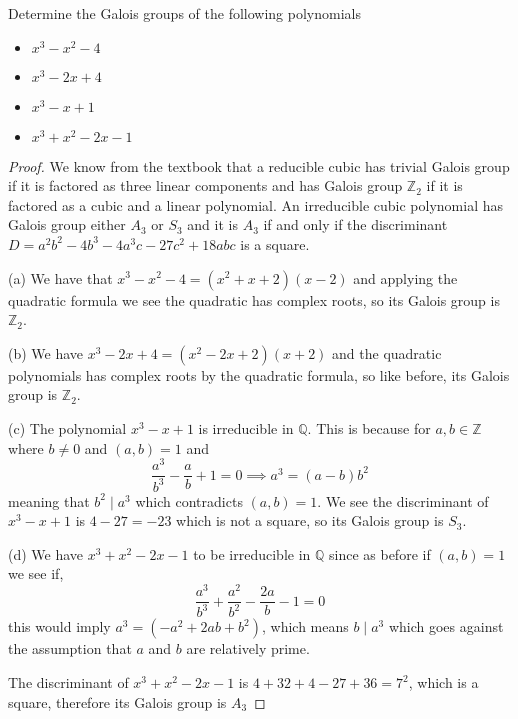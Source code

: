 \documentclass[11pt]{article}
\newenvironment{problem}[2][Problem\!]{\begin{tcolorbox}\begin{trivlist}
\item[\hskip \labelsep {\bfseries #1}\hskip \labelsep {\bfseries #2}]}{\end{trivlist}\end{tcolorbox}}
\newcommand{\zz}{\mathbb Z}   %
\newcommand{\qq}{\mathbb Q}   %
\begin{document}
\begin{problem}{14.6.2}
    Determine the Galois groups of the following polynomials
    \begin{itemize}
        \item[(a)] $x^{3} -x^{2} -4$
        \item[(b)] $x^{3} -2x + 4$
        \item[(c)] $x^{3} -x + 1$
        \item[(d)] $x^{3} + x^{2} -2x -1$
    \end{itemize}
\end{problem}
\begin{proof}
    We know from the textbook that a reducible cubic has trivial Galois group if it is factored as three linear components and has Galois group $\zz_2$ if it is factored as a cubic and a linear polynomial. An irreducible cubic polynomial has Galois group either $A_3$ or $S_3$ and it is $A_3$ if and only if the discriminant $D= a^{2}b^{2} -4b^{3} - 4a^{3}c -27c^{2} + 18abc$ is a square. 

    (a) We have that $x^{3} -x^{2} - 4 = (x^{2} + x + 2)(x-2)$ and applying the quadratic formula we see the quadratic has complex roots, so its Galois group is $\zz_2$.

    (b) We have $x^{3} -2x + 4 = (x^{2} -2x + 2)(x+2)$ and the quadratic polynomials has complex roots by the quadratic formula, so like before, its Galois group is $\zz_2$. 

    (c) The polynomial $x^{3} -x+1$ is irreducible in $\qq$. This is because for $a,b \in \zz$ where $b\neq 0$ and $(a,b) = 1$ and
    \[\dfrac{a^{3}}{b^{3}} -\dfrac{a}{b} + 1 = 0\implies a^{3} = (a-b)b^{2}\] meaning that $b^{2}\mid a^{3}$ which contradicts $(a,b) = 1$. We see the discriminant of $x^{3} - x + 1$ is $4-27 = -23$  which is not a square, so its Galois group is $S_3$. 

    (d) We have $x^{3} + x^{2} -2x -1$ to be irreducible in $\qq$ since as before if $(a,b) = 1$ we see if,
    \[\dfrac{a^{3}}{b^{3}} + \dfrac{a^{2}}{b^{2}} -\dfrac{2a}{b} -1 = 0\]
    this would imply $a^{3} = (-a^{2} + 2ab +b^{2})$, which means $b\mid a^{3}$ which goes against the assumption that $a$ and $b$ are relatively prime. 

    The discriminant of $x^{3} + x^{2} -2x -1$ is $4+32 +4 -27 +36 = 7^{2}$, which is a square, therefore its Galois group is $A_3$
\end{proof}

\vspace*{15pt}
\end{document}

